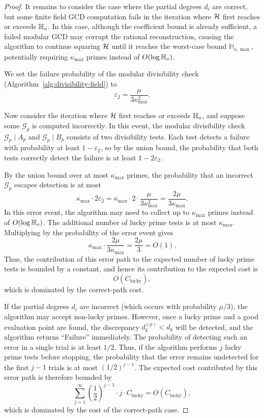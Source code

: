 \documentclass{article}
\numberwithin{equation}{section}
\begin{document}
\begin{proof}
It remains to consider the case where the partial degrees $d_i$ are correct, but some finite field GCD computation fails in the iteration where ${\mathcal{H}}$ first reaches or exceeds $\mathbb{H}_{o}$. In this case, although the coefficient bound is already sufficient, a failed modular GCD may corrupt the rational reconstruction, causing the algorithm to continue squaring ${\mathcal{H}}$ until it reaches the worst-case bound $\mathbb{H}_{o,\max}$, potentially requiring $\kappa_{\max}$ primes instead of $O(\log \mathbb{H}_{o})$.

We set the failure probability of the modular divisibility check (Algorithm~\ref{alg:divisibility-field}) to
\[
\varepsilon_2 = \frac{\mu}{3\kappa^2_{\max}}.
\]

Now consider the iteration where ${\mathcal{H}}$ first reaches or exceeds $\mathbb{H}_{o}$, and suppose some $\mathcal{G}_p$ is computed incorrectly. In this event, the modular divisibility check $\mathcal{G}_p \mid A_p$ and $\mathcal{G}_p \mid B_p$ consists of two divisibility tests. Each test detects a failure with probability at least $1 - \varepsilon_2$, so by the union bound, the probability that both tests correctly detect the failure is at least $1 - 2\varepsilon_2$.

By the union bound over at most $\kappa_{\max}$ primes, the probability that an incorrect $\mathcal{G}_p$ escapes detection is at most
\[
\kappa_{\max} \cdot 2\varepsilon_2
= \kappa_{\max} \cdot 2 \cdot \frac{\mu}{3\kappa^2_{\max}}
= \frac{2\mu}{3\kappa_{\max}}.
\]
In this error event, the algorithm may need to collect up to $\kappa_{\max}$ primes instead of $O(\log \mathbb{H}_{o})$. The additional number of lucky prime tests is at most $\kappa_{\max}$. Multiplying by the probability of the error event gives
\[
\kappa_{\max} \cdot \frac{2\mu}{3\kappa_{\max}} = \frac{2\mu}{3} = O(1).
\]
Thus, the contribution of this error path to the expected number of lucky prime tests is bounded by a constant, and hence its contribution to the expected cost is
\[
O(C_{\text{lucky}}),
\]
which is dominated by the correct-path cost.



If the partial degrees $d_i$ are incorrect (which occurs with probability $\mu/3$), the algorithm may accept non-lucky primes. However, once a lucky prime and a good evaluation point are found, the discrepancy $d_k^{(p)} < d_k$ will be detected, and the algorithm returns ``Failure'' immediately. The probability of detecting such an error in a single trial is at least $1/2$. Thus, if the algorithm performs $j$ lucky prime tests before stopping, the probability that the error remains undetected for the first $j-1$ trials is at most $(1/2)^{j-1}$. The expected cost contributed by this error path is therefore bounded by
\[
\sum_{j=1}^{\infty} \left(\frac{1}{2}\right)^{j-1} \cdot j \cdot C_{\text{lucky}}
= O(C_{\text{lucky}}),
\]
which is dominated by the cost of the correct-path case.


\end{proof}
\end{document}
